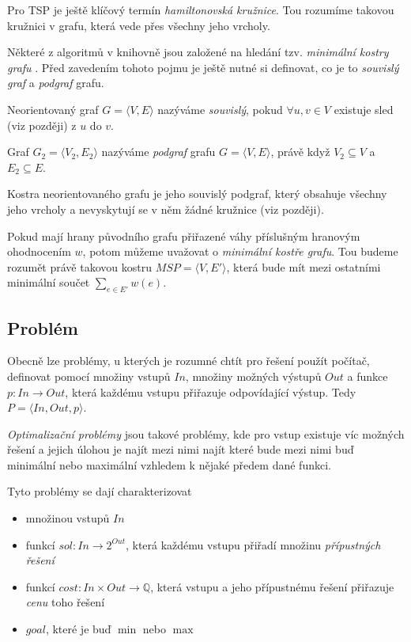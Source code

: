\documentclass[
  biblatex,
  figures=false,
  glossaries,
  index
]{kidiplom}
\begin{document}
Pro TSP je ještě klíčový termín \textit{hamiltonovská kružnice}. Tou rozumíme takovou kružnici v grafu, která vede přes všechny jeho vrcholy.
\newline

Některé z algoritmů v knihovně jsou založené na hledání tzv. \textit{minimální kostry grafu} . Před zavedením tohoto pojmu je ještě nutné si definovat, co je to \textit{souvislý graf} a \textit{podgraf} grafu.

\begin{definition}
Neorientovaný graf $G=\langle V, E \rangle$ nazýváme \textit{souvislý}, pokud $\forall u,v \in V$ existuje sled (viz později) z $u$ do $v$.
\end{definition}

\begin{definition}[Podgraf]
Graf $G_2=\langle V_2, E_2 \rangle$ nazýváme \textit{podgraf} grafu $G=\langle V, E \rangle$, právě když $V_2 \subseteq V$ a $E_2 \subseteq  E$.
\end{definition}

\begin{definition}
Kostra neorientovaného grafu je jeho souvislý podgraf, který obsahuje všechny jeho vrcholy a nevyskytují se v něm žádné kružnice (viz později).
\end{definition}

Pokud mají hrany původního grafu přiřazené váhy příslušným hranovým ohodnocením $w$, potom můžeme uvažovat o \textit{minimální kostře grafu}. Tou budeme rozumět právě takovou kostru $MSP = \langle V, E' \rangle$, která bude mít mezi ostatními minimální součet  $\sum_{e \in E'} w(e)$.

\subsection{Problém}
Obecně lze problémy, u kterých je rozumné chtít pro řešení použít počítač, definovat pomocí množiny vstupů $In$, množiny možných výstupů $Out$ a funkce $p : In \rightarrow Out$, která každému vstupu přiřazuje odpovídající výstup. Tedy $P = \langle In, Out, p \rangle$.

\textit{Optimalizační problémy} jsou takové problémy, kde pro vstup existuje víc možných řešení a jejich úlohou je najít mezi nimi najít které bude mezi nimi buď minimální nebo maximální vzhledem k nějaké předem dané funkci.

Tyto problémy se dají charakterizovat 
\begin{itemize}
\item množinou vstupů $In$
\item funkcí $sol : In \rightarrow 2^{Out}$, která každému vstupu přiřadí množinu \textit{přípustných řešení}
\item funkcí $cost : In \times Out \rightarrow \mathbb{Q}$, která vstupu a jeho přípustnému řešení přiřazuje \textit{cenu} toho řešení
\item $goal$, které je buď $\min$ nebo $\max$
\end{itemize}
\end{document}
